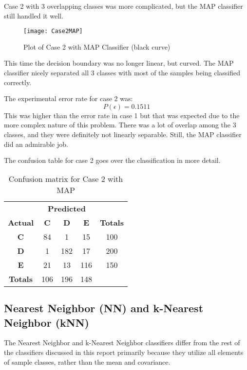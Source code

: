 \documentclass{article}
\begin{document}
Case 2 with 3 overlapping classes was more complicated, but the MAP classifier still handled it well.

\begin{figure}[H]
\caption{Plot of Case 2 with MAP Classifier (black curve)}
\centering
\texttt{[image: Case2MAP]}
\label{fig:Case2_MAP}
\end{figure}

This time the decision boundary was no longer linear, but curved. The MAP classifier nicely separated all 3 classes with most of the samples being classified correctly.

The experimental error rate for case 2 was:
$$
P(\epsilon) = 0.1511
$$
This was higher than the error rate in case 1 but that was expected due to the more complex nature of this problem. There was a lot of overlap among the 3 classes, and they were definitely not linearly separable. Still, the MAP classifier did an admirable job.

The confusion table for case 2 goes over the classification in more detail.
\begin{table}[H]
    \centering
    \begin{tabular}{c|c c c|c|}
        & \multicolumn{3}{c|}{\textbf{Predicted}} \\
        \textbf{Actual} & \textbf{C} & \textbf{D} & \textbf{E} & \textbf{Totals} \\
        \hline
        \textbf{C} & 84 \cellcolor[gray]{.8} & 1 & 15 & 100 \\
        \textbf{D} & 1 & 182 \cellcolor[gray]{.8} & 17 & 200\\
        \textbf{E} & 21 & 13 & 116 \cellcolor[gray]{.8} & 150\\\hline
        \textbf{Totals} & 106 & 196 & 148\\
        \cline{1-4}
    \end{tabular}
    \caption{Confusion matrix for Case 2 with MAP}
    \label{tab:Case2_MAP_error}
\end{table}


\subsection{Nearest Neighbor (NN) and k-Nearest Neighbor (kNN)}
The Nearest Neighbor and k-Nearest Neighbor classifiers differ from the rest of the classifiers discussed in this report primarily because they utilize all elements of sample classes, rather than the mean and covariance.
\end{document}
